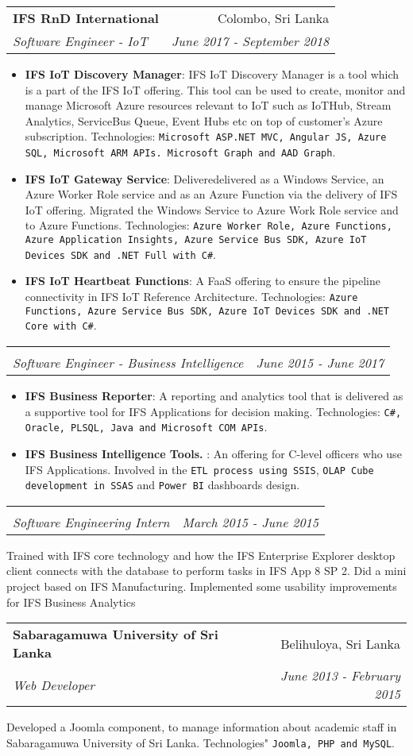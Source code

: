 \documentclass[letterpaper,11pt]{article}
\makeatletter
\newcommand{\resumeItem}[2]{
  \item\small{
    \textbf{#1}{: #2 \vspace{-2pt}}
  }
}
\newcommand{\resumeSubheading}[4]{
  \vspace{-1pt}\item
    \begin{tabular*}{0.97\textwidth}{l@{\extracolsep{\fill}}r}
      \textbf{#1} & #2 \\
      \textit{\small#3} & \textit{\small #4} \\
    \end{tabular*}\vspace{-5pt}
}
\newcommand{\resumeItemListStart}{\begin{itemize}}
\newcommand{\resumeItemListEnd}{\end{itemize}\vspace{-5pt}}
\makeatother
\begin{document}
    \resumeSubheading
      {IFS RnD International}{Colombo, Sri Lanka}
      {Software Engineer - IoT}{June 2017 - September 2018}
      \resumeItemListStart
        \resumeItem{IFS IoT Discovery Manager}
          {IFS IoT Discovery Manager is a tool which is a part of the IFS IoT offering. This tool can be used to create, monitor and manage Microsoft Azure resources relevant to IoT such as IoTHub, Stream Analytics, ServiceBus Queue, Event Hubs etc on top of customer's Azure subscription. Technologies: \texttt{Microsoft ASP.NET MVC, Angular JS, Azure SQL, Microsoft ARM APIs. Microsoft Graph and AAD Graph}.}
        \resumeItem{IFS IoT Gateway Service}
          {Deliveredelivered as a Windows Service, an Azure Worker Role service and as an Azure Function via the delivery of IFS IoT offering. Migrated the Windows Service to Azure Work Role service and to Azure Functions. Technologies: \texttt{Azure Worker Role, Azure Functions, Azure Application Insights, Azure Service Bus SDK, Azure IoT Devices SDK and .NET Full with C\#}. }
        \resumeItem{IFS IoT Heartbeat Functions}
          {A FaaS offering to ensure the pipeline connectivity in IFS IoT Reference Architecture. Technologies: \texttt{Azure Functions, Azure Service Bus SDK, Azure IoT Devices SDK and .NET Core with C\#}.}
      \resumeItemListEnd
      
    \resumeSubheading {}{}
      {Software Engineer - Business Intelligence}{June 2015 - June 2017}
      \resumeItemListStart
        \resumeItem{IFS Business Reporter}
          {A reporting and analytics tool that is delivered as a supportive tool for IFS Applications for decision making. Technologies: \texttt{C\#, Oracle, PLSQL, Java and Microsoft COM APIs}. }
        \resumeItem{IFS Business Intelligence Tools. }
          {An offering for C-level officers who use IFS Applications. Involved in the \texttt{ETL process using SSIS}, \texttt{OLAP Cube development in SSAS} and \texttt{Power BI} dashboards design. }
      \resumeItemListEnd  
      
    \resumeSubheading{}{}
      {Software Engineering Intern}{March 2015 - June 2015}
      \resumeItemListStart
        {Trained with IFS core technology and how the IFS Enterprise Explorer desktop client connects with the database to perform tasks in IFS App 8 SP 2. Did a mini project based on IFS Manufacturing. Implemented some usability improvements for IFS Business Analytics}
      \resumeItemListEnd           
      
    \resumeSubheading
      {Sabaragamuwa University of Sri Lanka}{Belihuloya, Sri Lanka}
      {Web Developer}{June 2013 - February 2015}
      \resumeItemListStart
        {Developed a Joomla component, to manage information about academic staff in Sabaragamuwa University of Sri Lanka. Technologies" \texttt{Joomla, PHP and MySQL}.}
      \resumeItemListEnd   
      
\end{document}
